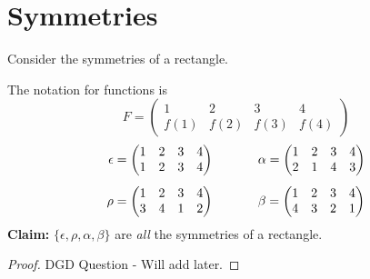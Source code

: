\documentclass[openany]{report}
\begin{document}
\section{Symmetries}
Consider the symmetries of a rectangle.\\
\begin{center}
\end{center}
The notation for functions is 
$$F = \begin{pmatrix}
1 & 2 & 3 & 4\\
f(1) & f(2) & f(3) & f(4)
\end{pmatrix}$$
\begin{align*}
    \epsilon = \begin{pmatrix}
        1 & 2 & 3 & 4\\
        1 & 2 & 3 & 4
    \end{pmatrix} \hspace{0.5in}& 
    \alpha = \begin{pmatrix}
        1 & 2 & 3 & 4\\
        2 & 1 & 4 & 3
    \end{pmatrix}\\[1ex]
    \rho = \begin{pmatrix}
        1 & 2 & 3 & 4\\
        3 & 4 & 1 & 2
    \end{pmatrix} \hspace{0.5in}&
    \beta = \begin{pmatrix}
        1 & 2  & 3 & 4\\
        4 & 3 & 2 & 1
    \end{pmatrix}
\end{align*}
\textbf{Claim:} $\{\epsilon, \rho, \alpha, \beta\}$ are \emph{all} the symmetries of a rectangle.
\begin{proof}
    DGD Question - Will add later.
\end{proof}
\end{document}
